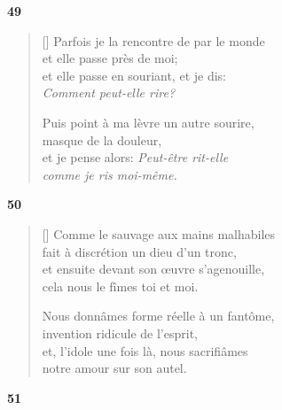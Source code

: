 \documentclass[a4paper,12pt]{book}
\begin{document}
\bigskip

\begin{center}
  \textbf{49}
\end{center}

\settowidth{\versewidth}{Puis point à ma lèvre un autre sourire,}

\begin{verse}[\versewidth]
  Parfois je la rencontre de par le monde \\
  et elle passe près de moi; \\
  et elle passe en souriant, et je dis: \\
  \emph{Comment peut-elle \emph{rire}?}

  Puis point à ma lèvre un autre sourire, \\
  masque de la douleur, \\
  et je pense alors: \emph{Peut-être rit-elle \\
  comme je ris moi-même.}
\end{verse}

\bigskip

\begin{center}
  \textbf{50}
\end{center}

\settowidth{\versewidth}{et, l'idole une fois là, nous sacrifiâmes}

\begin{verse}[\versewidth]
  Comme le sauvage aux mains malhabiles \\
  fait à discrétion un dieu d'un tronc, \\
  et ensuite devant son œuvre s'agenouille, \\
  cela nous le fîmes toi et moi.

  Nous donnâmes forme réelle à un fantôme, \\
  invention ridicule de l'esprit, \\
  et, l'idole une fois là, nous sacrifiâmes \\
  notre amour sur son autel.
\end{verse}


\begin{center}
  \textbf{51}
\end{center}
\end{document}
